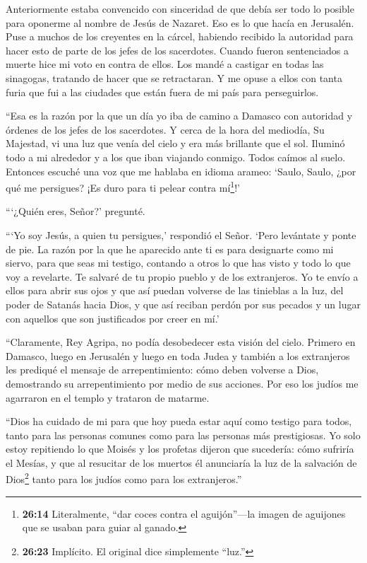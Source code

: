  Anteriormente estaba convencido con sinceridad de que debía
ser todo lo posible para oponerme al nombre de Jesús de Nazaret.
 Eso es lo que hacía en Jerusalén. Puse a muchos de los
creyentes en la cárcel, habiendo recibido la autoridad para hacer esto
de parte de los jefes de los sacerdotes. Cuando fueron sentenciados a
muerte hice mi voto en contra de ellos.  Los mandé a
castigar en todas las sinagogas, tratando de hacer que se retractaran. Y
me opuse a ellos con tanta furia que fui a las ciudades que están fuera
de mi país para perseguirlos.

 ``Esa es la razón por la que un día yo iba de camino a
Damasco con autoridad y órdenes de los jefes de los sacerdotes.
 Y cerca de la hora del mediodía, Su Majestad, vi una luz
que venía del cielo y era más brillante que el sol. Iluminó todo a mi
alrededor y a los que iban viajando conmigo.  Todos caímos
al suelo. Entonces escuché una voz que me hablaba en idioma arameo:
`Saulo, Saulo, ¿por qué me persigues? ¡Es duro para ti pelear contra
mí\footnote{\textbf{26:14} Literalmente, ``dar coces contra el
  aguijón''---la imagen de aguijones que se usaban para guiar al ganado.}!'

 ```¿Quién eres, Señor?' pregunté.

```Yo soy Jesús, a quien tu persigues,' respondió el Señor.
 `Pero levántate y ponte de pie. La razón por la que he
aparecido ante ti es para designarte como mi siervo, para que seas mi
testigo, contando a otros lo que has visto y todo lo que voy a
revelarte.  Te salvaré de tu propio pueblo y de los
extranjeros. Yo te envío a ellos  para abrir sus ojos y que
así puedan volverse de las tinieblas a la luz, del poder de Satanás
hacia Dios, y que así reciban perdón por sus pecados y un lugar con
aquellos que son justificados por creer en mí.'

 ``Claramente, Rey Agripa, no podía desobedecer esta visión
del cielo.  Primero en Damasco, luego en Jerusalén y luego
en toda Judea y también a los extranjeros les prediqué el mensaje de
arrepentimiento: cómo deben volverse a Dios, demostrando su
arrepentimiento por medio de sus acciones.  Por eso los
judíos me agarraron en el templo y trataron de matarme.

 ``Dios ha cuidado de mi para que hoy pueda estar aquí como
testigo para todos, tanto para las personas comunes como para las
personas más prestigiosas. Yo solo estoy repitiendo lo que Moisés y los
profetas dijeron que sucedería:  cómo sufriría el Mesías, y
que al resucitar de los muertos él anunciaría la luz de la salvación de
Dios\footnote{\textbf{26:23} Implícito. El original dice simplemente
  ``luz.''} tanto para los judíos como para los extranjeros.''

